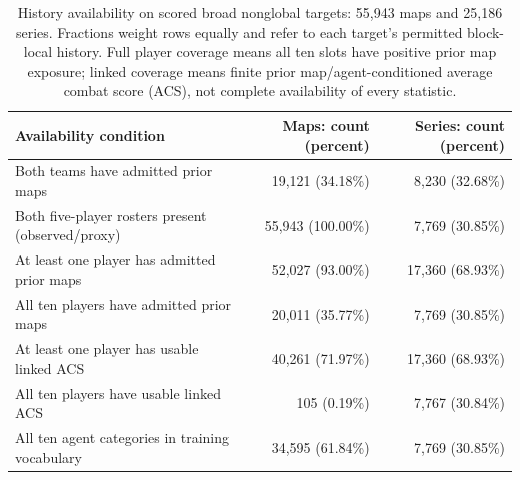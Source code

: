 \begin{table}[!t]
\centering\small
\caption{History availability on scored broad nonglobal targets: 55,943 maps and 25,186 series. Fractions weight rows equally and refer to each target's permitted block-local history. Full player coverage means all ten slots have positive prior map exposure; linked coverage means finite prior map/agent-conditioned average combat score (ACS), not complete availability of every statistic.}\label{tab:history-coverage}
\begin{tabular}{lrr}\toprule
Availability condition & Maps: count (percent) & Series: count (percent) \\ \midrule
Both teams have admitted prior maps & 19,121 (34.18\%) & 8,230 (32.68\%) \\
Both five-player rosters present (observed/proxy) & 55,943 (100.00\%) & 7,769 (30.85\%) \\
At least one player has admitted prior maps & 52,027 (93.00\%) & 17,360 (68.93\%) \\
All ten players have admitted prior maps & 20,011 (35.77\%) & 7,769 (30.85\%) \\
At least one player has usable linked ACS & 40,261 (71.97\%) & 17,360 (68.93\%) \\
All ten players have usable linked ACS & 105 (0.19\%) & 7,767 (30.84\%) \\
All ten agent categories in training vocabulary & 34,595 (61.84\%) & 7,769 (30.85\%) \\
\bottomrule\end{tabular}
\end{table}

